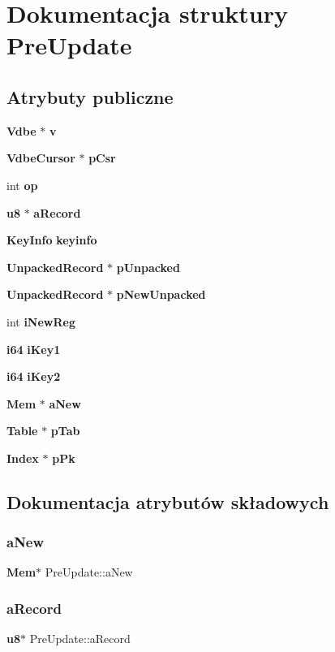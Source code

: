 \section{Dokumentacja struktury Pre\+Update}
\label{struct_pre_update}
\subsection*{Atrybuty publiczne}
\begin{DoxyCompactItemize}
\item 
\textbf{ Vdbe} $\ast$ \textbf{ v}
\item 
\textbf{ Vdbe\+Cursor} $\ast$ \textbf{ p\+Csr}
\item 
int \textbf{ op}
\item 
\textbf{ u8} $\ast$ \textbf{ a\+Record}
\item 
\textbf{ Key\+Info} \textbf{ keyinfo}
\item 
\textbf{ Unpacked\+Record} $\ast$ \textbf{ p\+Unpacked}
\item 
\textbf{ Unpacked\+Record} $\ast$ \textbf{ p\+New\+Unpacked}
\item 
int \textbf{ i\+New\+Reg}
\item 
\textbf{ i64} \textbf{ i\+Key1}
\item 
\textbf{ i64} \textbf{ i\+Key2}
\item 
\textbf{ Mem} $\ast$ \textbf{ a\+New}
\item 
\textbf{ Table} $\ast$ \textbf{ p\+Tab}
\item 
\textbf{ Index} $\ast$ \textbf{ p\+Pk}
\end{DoxyCompactItemize}


\subsection{Dokumentacja atrybutów składowych}
\mbox{\label{struct_pre_update_a3d8862bac16113aeb528b1aeafe4f118}} 
\subsubsection{aNew}
{\footnotesize\ttfamily \textbf{ Mem}$\ast$ Pre\+Update\+::a\+New}

\mbox{\label{struct_pre_update_a148cb72a74c7943828e02a5ce88ef662}} 
\subsubsection{aRecord}
{\footnotesize\ttfamily \textbf{ u8}$\ast$ Pre\+Update\+::a\+Record}

